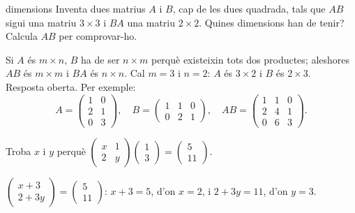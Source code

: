 \begin{apartats}
\begin{tria}{dimensions}
Inventa dues matrius $A$ i $B$, cap de les dues quadrada, tals que $AB$ sigui una matriu $3\times3$ i
$BA$ una matriu $2\times2$. Quines dimensions han de tenir? Calcula $AB$ per comprovar-ho.

\begin{solucio}
Si $A$ és $m\times n$, $B$ ha de ser $n\times m$ perquè existeixin tots dos productes; aleshores $AB$ és
$m\times m$ i $BA$ és $n\times n$. Cal $m=3$ i $n=2$: $A$ és $3\times2$ i $B$ és $2\times3$.\\
Resposta oberta. Per exemple:
\[
A=\begin{pmatrix}1&0\\2&1\\0&3\end{pmatrix},\quad
B=\begin{pmatrix}1&1&0\\0&2&1\end{pmatrix},\quad
AB=\begin{pmatrix}1&1&0\\2&4&1\\0&6&3\end{pmatrix}.
\]
\end{solucio}
\end{tria}

\begin{nomesllarg}
Troba $x$ i $y$ perquè
$\begin{pmatrix}x&1\\2&y\end{pmatrix}\begin{pmatrix}1\\3\end{pmatrix}=\begin{pmatrix}5\\11\end{pmatrix}$.

\begin{solucio}
$\begin{pmatrix}x+3\\2+3y\end{pmatrix}=\begin{pmatrix}5\\11\end{pmatrix}$: $x+3=5$, d'on $x=2$, i
$2+3y=11$, d'on $y=3$.
\end{solucio}
\end{nomesllarg}

\end{apartats}
